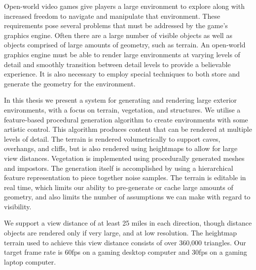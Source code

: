 Open-world video games give players a large environment to explore along with increased freedom to navigate and manipulate that environment.
These requirements pose several problems that must be addressed by the game’s graphics engine.
Often there are a large number of visible objects as well as objects comprised of large amounts of geometry, such as terrain.
An open-world graphics engine must be able to render large environments at varying levels of detail and smoothly transition between detail levels to provide a believable experience.
It is also necessary to employ special techniques to both store and generate the geometry for the environment.

In this thesis we present a system for generating and rendering large exterior environments, with a focus on terrain, vegetation, and structures.
We utilise a feature-based procedural generation algorithm to create environments with some artistic control.
This algorithm produces content that can be rendered at multiple levels of detail.
The terrain is rendered volumetrically to support caves, overhangs, and cliffs, but is also rendered using heightmaps to allow for large view distances.
Vegetation is implemented using procedurally generated meshes and impostors.
The generation itself is accomplished by using a hierarchical feature representation to piece together noise samples.
The terrain is editable in real time, which limits our ability to pre-generate or cache large amounts of geometry, and also limits the number of assumptions we can make with regard to visibility.

We support a view distance of at least 25 miles in each direction, though distance objects are rendered only if very large, and at low resolution.
The heightmap terrain used to achieve this view distance consists of over 360,000 triangles.
Our target frame rate is 60fps on a gaming desktop computer and 30fps on a gaming laptop computer.
